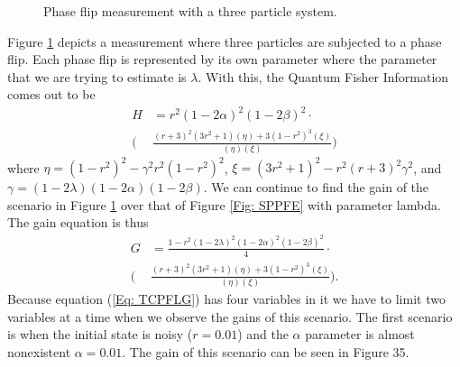 \documentclass[twocolumn]{article}
\begin{document}
\begin{figure}[ht]
    \caption{\footnotesize{Phase flip measurement with a three particle system.}}
    \label{Fig: TCPFL} 
\end{figure}
\par \noindent
Figure \ref{Fig: TCPFL} depicts a measurement where three particles are subjected to a phase flip. Each phase flip is represented by its own parameter where the parameter that we are trying to estimate is $\lambda$. With this, the Quantum Fisher Information comes out to be
\begin{align}\label{Eq: TCPFLQFI}
H&=r^2(1-2\alpha)^2(1-2\beta)^2\cdot \nonumber \\
\bigg(&\frac{(r+3)^2(3r^2+1)(\eta)+3(1-r^2)^3(\xi)}{(\eta)(\xi)}\bigg)
\end{align}
where $\eta=(1-r^2)^2-\gamma^2r^2(1-r^2)^2$, $\xi=(3r^2+1)^2-r^2(r+3)^2\gamma^2$, and $\gamma=(1-2\lambda)(1-2\alpha)(1-2\beta)$. We can continue to find the gain of the scenario in Figure \ref{Fig: TCPFL} over that of Figure \ref{Fig: SPPFE} with parameter lambda. The gain equation is thus
\begin{align}\label{Eq: TCPFLG}
G&=\frac{1-r^2(1-2\lambda)^2(1-2\alpha)^2(1-2\beta)^2}{4}\cdot \nonumber \\
\bigg(&\frac{(r+3)^2(3r^2+1)(\eta)+3(1-r^2)^3(\xi)}{(\eta)(\xi)}\bigg).
\end{align}
Because equation (\ref{Eq: TCPFLG}) has four variables in it we have to limit two variables at a time when we observe the gains of this scenario. The first scenario is when the initial state is noisy ($r=0.01$) and the $\alpha$ parameter is almost nonexistent $\alpha=0.01$. The gain of this scenario can be seen in Figure 35.
\end{document}
